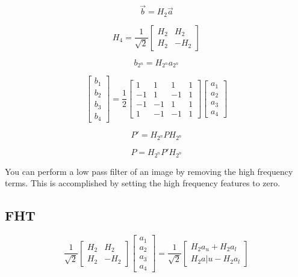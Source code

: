 \documentclass[letterpaper, 9pt]{article}
\begin{document}
\begin{equation}
\vec{b} = H_2\vec{a}
\end{equation}

\begin{equation}
H_4 = \frac{1}{\sqrt{2}}
\begin{bmatrix}
H_2 & H_2\\
H_2 & -H_2
\end{bmatrix}
\end{equation}

\begin{equation}
b_{2^n} = H_{2^n}a_{2^n}
\end{equation}

\begin{equation}
\begin{bmatrix}
b_1\\
b_2\\
b_3\\
b_4
\end{bmatrix}
 = 
\frac{1}{2}
\begin{bmatrix}
1 & 1 & 1 & 1\\
-1 & 1 & -1 & 1\\
-1 & -1 & 1 & 1\\
1 & -1 & -1 & 1
\end{bmatrix}
\begin{bmatrix}
a_1\\
a_2\\
a_3\\
a_4
\end{bmatrix}
\end{equation}

\begin{equation}
P' = H_{2^n} P H_{2^n}
\end{equation}

\begin{equation}
P = H_{2^n}P'H_{2^n}
\end{equation}

You can perform a low pass filter of an image by removing the high frequency terms.  This is accomplished by setting the high frequency features to zero.

\subsection{FHT}
\begin{equation}
\frac{1}{\sqrt{2}}
\begin{bmatrix}
H_2 & H_2\\
H_2 & -H_2
\end{bmatrix}
\begin{bmatrix}
a_1\\
a_2\\
a_3\\
a_4
\end{bmatrix}
=
\frac{1}{\sqrt{2}}
\begin{bmatrix}
H_2a_u + H_2a_l\\
H_2a|u - H_2a_l
\end{bmatrix}
\end{equation}
\end{document}
